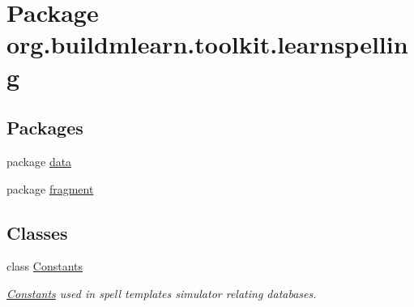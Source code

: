 \hypertarget{namespaceorg_1_1buildmlearn_1_1toolkit_1_1learnspelling}{}\section{Package org.\+buildmlearn.\+toolkit.\+learnspelling}
\label{namespaceorg_1_1buildmlearn_1_1toolkit_1_1learnspelling}
\subsection*{Packages}
\begin{DoxyCompactItemize}
\item 
package \hyperlink{namespaceorg_1_1buildmlearn_1_1toolkit_1_1learnspelling_1_1data}{data}
\item 
package \hyperlink{namespaceorg_1_1buildmlearn_1_1toolkit_1_1learnspelling_1_1fragment}{fragment}
\end{DoxyCompactItemize}
\subsection*{Classes}
\begin{DoxyCompactItemize}
\item 
class \hyperlink{classorg_1_1buildmlearn_1_1toolkit_1_1learnspelling_1_1Constants}{Constants}
\begin{DoxyCompactList}\small\item\em \hyperlink{classorg_1_1buildmlearn_1_1toolkit_1_1learnspelling_1_1Constants}{Constants} used in spell template\textquotesingle{}s simulator relating databases. \end{DoxyCompactList}\end{DoxyCompactItemize}
